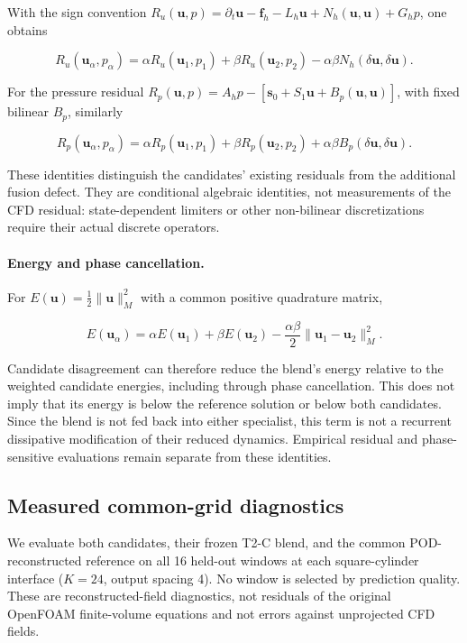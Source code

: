 \documentclass{article}
\providecommand{\DIFaddtex}[1]{{\protect\color{blue} \sf #1}} %
\providecommand{\DIFaddbegin}{} %
\providecommand{\DIFadd}[1]{\texorpdfstring{\DIFaddtex{#1}}{#1}} %
\begin{document}
With the sign convention
$R_u(\bm u,p)=\partial_t\bm u-\bm f_h-L_h\bm u+N_h(\bm u,\bm u)+G_hp$, one obtains


\begin{equation}
R_u(\bm u_\alpha,p_\alpha)
=\alpha R_u(\bm u_1,p_1)+\beta R_u(\bm u_2,p_2)
-\alpha\beta N_h(\delta\bm u,\delta\bm u).
\end{equation}


For the pressure residual
$R_p(\bm u,p)=A_hp-[\bm s_0+S_1\bm u+B_p(\bm u,\bm u)]$, with fixed bilinear $B_p$, similarly


\begin{equation}
R_p(\bm u_\alpha,p_\alpha)
=\alpha R_p(\bm u_1,p_1)+\beta R_p(\bm u_2,p_2)
+\alpha\beta B_p(\delta\bm u,\delta\bm u).
\end{equation}


These identities distinguish the candidates' existing residuals from the additional fusion defect. They are conditional algebraic identities, not measurements of the CFD residual: state-dependent limiters or other non-bilinear discretizations require their actual discrete operators.

\paragraph{Energy and phase cancellation.}
For $E(\bm u)=\tfrac12\|\bm u\|_M^2$ with a common positive quadrature matrix,


\begin{equation}
E(\bm u_\alpha)=\alpha E(\bm u_1)+\beta E(\bm u_2)
-\frac{\alpha\beta}{2}\|\bm u_1-\bm u_2\|_M^2.
\end{equation}


Candidate disagreement can therefore reduce the blend's energy relative to the weighted candidate energies, including through phase cancellation. This does not imply that its energy is below the reference solution or below both candidates. Since the blend is not fed back into either specialist, this term is not a recurrent dissipative modification of their reduced dynamics. Empirical residual and phase-sensitive evaluations remain separate from these identities.
\DIFaddbegin 

\subsection{\DIFadd{Measured common-grid diagnostics}}
\label{app:fusion_measured}
\DIFadd{We evaluate both candidates, their frozen T2-C blend, and the common
POD-reconstructed reference on all 16 held-out windows at each square-cylinder
interface ($K=24$, output spacing 4). No window is selected by prediction
quality. These are reconstructed-field diagnostics, not residuals of the
original OpenFOAM finite-volume equations and not errors against unprojected
CFD fields.
}
\end{document}
